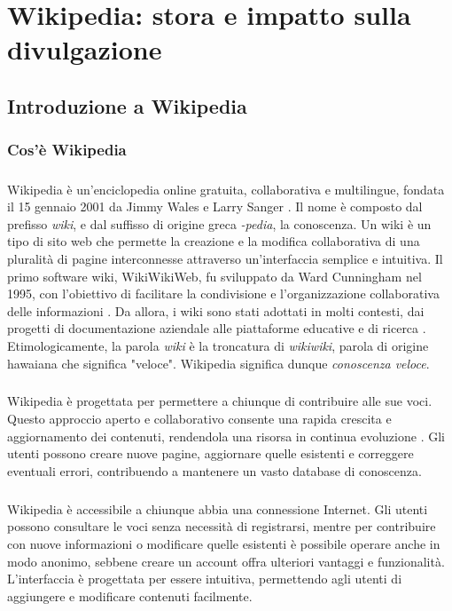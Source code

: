 \documentclass[12pt,a4paper]{report}
\begin{document}
\tableofcontents
\newpage

\chapter{Wikipedia: stora e impatto sulla divulgazione}
\section{Introduzione a Wikipedia}
\subsection{Cos'è Wikipedia}
\paragraph*{}
Wikipedia è un'enciclopedia online gratuita, collaborativa e multilingue, fondata il 15 gennaio 2001 da Jimmy Wales e Larry Sanger \cite{lih2009wikipedia}. Il nome è composto dal prefisso \textit{wiki}, e dal suffisso di origine greca \textit{-pedia}, la conoscenza. Un wiki è un tipo di sito web che permette la creazione e la modifica collaborativa di una pluralità di pagine interconnesse attraverso un'interfaccia semplice e intuitiva. Il primo software wiki, WikiWikiWeb, fu sviluppato da Ward Cunningham nel 1995, con l'obiettivo di facilitare la condivisione e l'organizzazione collaborativa delle informazioni \cite{history_of_wikis}. Da allora, i wiki sono stati adottati in molti contesti, dai progetti di documentazione aziendale alle piattaforme educative e di ricerca \cite{ebersbach2008wiki}. Etimologicamente, la parola \textit{wiki} è la troncatura di \textit{wikiwiki}, parola di origine hawaiana che significa "veloce". Wikipedia significa dunque \textit{conoscenza veloce}.
\paragraph*{}
Wikipedia è progettata per permettere a chiunque di contribuire alle sue voci. Questo approccio aperto e collaborativo consente una rapida crescita e aggiornamento dei contenuti, rendendola una risorsa in continua evoluzione \cite{reagle2010good}. Gli utenti possono creare nuove pagine, aggiornare quelle esistenti e correggere eventuali errori, contribuendo a mantenere un vasto database di conoscenza.
\paragraph*{}
Wikipedia è accessibile a chiunque abbia una connessione Internet. Gli utenti possono consultare le voci senza necessità di registrarsi, mentre per contribuire con nuove informazioni o modificare quelle esistenti è possibile operare anche in modo anonimo, sebbene creare un account offra ulteriori vantaggi e funzionalità. L'interfaccia è progettata per essere intuitiva, permettendo agli utenti di aggiungere e modificare contenuti facilmente.
\end{document}
